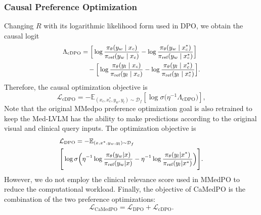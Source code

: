 \subsubsection{Causal Preference Optimization}
Changing $R$ with its logarithmic likelihood form used in DPO, we obtain the causal logit
\begin{equation}
\small
\begin{aligned}
\Lambda_{\text{cDPO}}
&=\Big[
\log \frac{\pi_\theta(y_w \mid x_c)}{\pi_{\text{ref}}(y_w \mid x_c)}
-\log \frac{\pi_\theta(y_w \mid x_c^*)}{\pi_{\text{ref}}(y_w \mid x_c^*)}
\Big]  \\
&\quad -
\Big[
\log \frac{\pi_\theta(y_l \mid x_c)}{\pi_{\text{ref}}(y_l \mid x_c)}
-\log \frac{\pi_\theta(y_l \mid x_c^*)}{\pi_{\text{ref}}(y_l \mid x_c^*)}
\Big].
\end{aligned}
\end{equation} Therefore, the causal optimization objective is
\begin{equation}
\mathcal{L}_{\text{cDPO}}
= -\mathbb{E}_{(x_c,x_c^*,y_w,y_l)\sim\mathcal{D}_f}
  \left[\log\sigma\!\big(\eta^{-1}\Lambda_{\text{cDPO}}\big)\right],
\end{equation}
Note that the original MMedpo preference optimization goal is also retrained to keep the Med-LVLM has the ability to make predictions according to the original visual and clinical query inputs. The optimization objective is
\begin{equation}
\small
\begin{aligned}
&\mathcal{L}_{\text{DPO}} = -\mathbb{E}_{(x,x^*,y_w,y_l)\sim\mathcal{D}_f} \\
&\Bigg[
\log \sigma \Big(
\eta^{-1} \log \frac{\pi_\theta(y_w|x)}{\pi_{\text{ref}}(y_w|x)}
- \eta^{-1} \log \frac{\pi_\theta(y_l|x^*)}{\pi_{\text{ref}}(y_l|x^*)}
\Big) \Bigg].
\end{aligned}
\end{equation} However, we do not employ the clinical relevance score used in MMedPO to reduce the computational workload. Finally, the objective of CaMedPO is the combination of the two preference optimizations:
\begin{equation} \mathcal{L}_\text{CaMedPO}=\mathcal{L}_{\text{DPO}}+\mathcal{L}_{\text{cDPO}}.
\label{eq:final_loss}
\end{equation}





